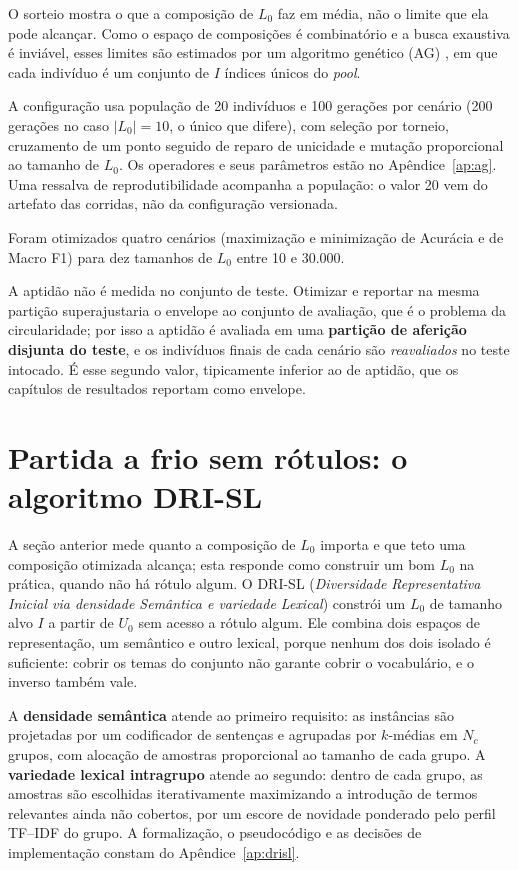 O sorteio mostra o que a composição de $L_0$ faz em média, não o limite que
ela pode alcançar. Como o espaço de composições é combinatório e a busca exaustiva é
inviável, esses limites são estimados por um algoritmo genético (AG)
\citep{Holland1975,Goldberg1989}, em que cada indivíduo é um conjunto de $I$
índices únicos do \textit{pool}.

A configuração usa população de 20 indivíduos e 100 gerações por cenário (200
gerações no caso $|L_0|=10$, o único que difere), com seleção por torneio,
cruzamento de um ponto seguido de reparo de unicidade e mutação proporcional ao
tamanho de $L_0$. Os operadores e seus parâmetros estão no
Apêndice~\ref{ap:ag}. Uma ressalva de reprodutibilidade acompanha a população:
o valor 20 vem do artefato das corridas, não da configuração versionada.

Foram otimizados quatro cenários (maximização e minimização de Acurácia e de
Macro F1) para dez tamanhos de $L_0$ entre 10 e 30.000.

A aptidão não é medida no conjunto de teste. Otimizar e reportar na mesma
partição superajustaria o envelope ao conjunto de avaliação, que é o problema
da circularidade; por isso a aptidão é avaliada em uma \textbf{partição de
aferição disjunta do teste}, e os indivíduos finais de cada cenário são
\emph{reavaliados} no teste intocado. É esse segundo valor, tipicamente
inferior ao de aptidão, que os capítulos de resultados reportam como envelope.
\section{Partida a frio sem rótulos: o algoritmo DRI-SL}
\label{sec:metodo-drisl}

A seção anterior mede quanto a composição de $L_0$ importa e que teto uma
composição otimizada alcança; esta responde como construir
um bom $L_0$ na prática, quando não há rótulo algum. O DRI-SL (\textit{Diversidade
Representativa Inicial via densidade Semântica e
variedade Lexical}) constrói um $L_0$ de tamanho alvo $I$ a partir de $U_0$ sem
acesso a rótulo algum. Ele combina dois espaços de representação, um semântico
e outro lexical, porque nenhum dos dois isolado é suficiente: cobrir os temas do
conjunto não garante cobrir o vocabulário, e o inverso também vale.

A \textbf{densidade semântica} atende ao primeiro requisito: as instâncias são projetadas
por um codificador de sentenças \citep{Reimers2019SBERT} e agrupadas por
$k$-médias em $N_c$ grupos, com alocação de amostras proporcional ao tamanho de
cada grupo. A \textbf{variedade lexical intragrupo} atende ao segundo: dentro de
cada grupo, as amostras são escolhidas iterativamente maximizando a introdução
de termos relevantes ainda não cobertos, por um escore de novidade ponderado
pelo perfil TF--IDF do grupo. A formalização, o pseudocódigo e as decisões de
implementação constam do Apêndice~\ref{ap:drisl}.

